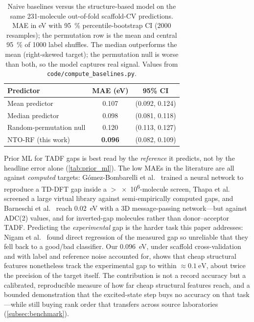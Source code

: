 \begin{table}[htbp]
  \centering
  \caption{Naive baselines versus the structure-based model on the same
    \num{231}-molecule out-of-fold scaffold-CV predictions. MAE in eV with
    \qty{95}{\percent} percentile-bootstrap CI (\num{2000} resamples); the
    permutation row is the mean and central \qty{95}{\percent} of \num{1000}
    label shuffles. The median outperforms the mean (right-skewed target); the
    permutation null is worse than both, so the model captures real signal.
    Values from \texttt{code/compute\_baselines.py}.}
  \label{tab:baselines}
  \begin{tabular}{lcc}
    \toprule
    Predictor & MAE (eV) & 95\% CI \\
    \midrule
    Mean predictor          & 0.107 & (0.092, 0.124) \\
    Median predictor        & 0.098 & (0.081, 0.118) \\
    Random-permutation null & 0.120 & (0.113, 0.127) \\
    \midrule
    NTO-RF (this work)      & \textbf{0.096} & (0.082, 0.109) \\
    \bottomrule
  \end{tabular}
\end{table}

Prior ML for TADF gaps is best read by the \emph{reference} it predicts, not by
the headline error alone (\cref{tab:prior_ml}). The low MAEs in the literature are
all against \emph{computed} targets: G\'omez-Bombarelli et
al.~\cite{Gomez-Bombarelli2016} trained a neural network to reproduce a TD-DFT gap
inside a $>$\num{e6}-molecule screen, Thapa et al.~\cite{Thapa2025} screened a
large virtual library against semi-empirically computed gaps, and Barneschi et al.~\cite{Barneschi2024}
reach \qty{0.02}{\electronvolt} with a 3D message-passing network---but against
ADC(2) values, and for inverted-gap molecules rather than donor--acceptor TADF.
Predicting the \emph{experimental} gap is the harder task this paper addresses:
Nigam et al.~\cite{Nigam2024} found direct regression of the measured gap so
unreliable that they fell back to a good/bad classifier. Our
\qty{0.096}{\electronvolt}, under scaffold cross-validation and with label and
reference noise accounted for, shows that cheap structural features nonetheless
track the experimental gap to within $\approx\qty{0.1}{\electronvolt}$, about twice the
precision of the target itself. The contribution is not a record accuracy but a calibrated,
reproducible measure of how far cheap structural features reach, and a bounded
demonstration that the excited-state step buys no accuracy on that task---while
still buying rank order that transfers across source laboratories
(\cref{subsec:benchmark}).


